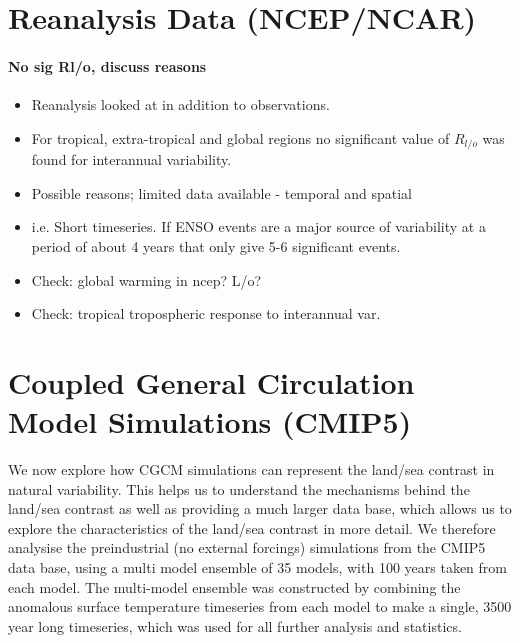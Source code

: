 
\section{Reanalysis Data (NCEP/NCAR)}

\paragraph{No sig Rl/o, discuss reasons}
\begin{itemize}
	\item Reanalysis looked at in addition to observations.
	\item For tropical, extra-tropical and global regions no significant value 
		of $R_{l/o}$ was found for interannual variability.
	\item Possible reasons; limited data available - temporal and spatial
	\item i.e. Short timeseries. If ENSO events are a major source of 
		variability at a period of about 4 years that only give 5-6 significant 
		events.
	\item Check: global warming in ncep? L/o?
	\item Check: tropical tropospheric response to interannual var.
\end{itemize}



\section{Coupled General Circulation Model Simulations (CMIP5)}

We now explore how CGCM simulations can represent the land/sea contrast in 
natural variability. This helps us to understand the mechanisms behind the 
land/sea contrast as well as providing a much larger data base, which allows us 
to explore the characteristics of the land/sea contrast in more detail. We 
therefore analysise the preindustrial (no external forcings) simulations from 
the CMIP5 data base, using a multi model ensemble of 35 models, with 100 years 
taken from each model. The multi-model ensemble was constructed by combining the 
anomalous surface temperature timeseries from each model to make a single, 3500 
year long timeseries, which was used for all further analysis and statistics. 

